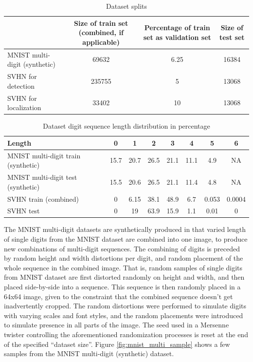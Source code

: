 \documentclass{article}
\begin{document}
	\begin{table}[h]
		\centering
		\begin{tabulary}{\linewidth}{l|CCC}
			\toprule
			& Size of train set (combined, if applicable) & Percentage of train set as validation set & Size of test set \\
			\midrule
			MNIST multi-digit (synthetic) & 69632                                       & 6.25                                      & 16384            \\
			SVHN for detection            & 235755                                      & 5                                         & 13068            \\
			SVHN for localization         & 33402                                       & 10                                       & 13068      		 \\
			\bottomrule      
		\end{tabulary}	
		\caption{Dataset splits}	
		\label{tab:dataset-splits}
	\end{table}
	
	\begin{table}[h]
		\centering
		\begin{tabulary}{\linewidth}{l|CCCCCCC}
			\toprule
			Length                              & 0    & 1    & 2    & 3    & 4    & 5     & 6      \\
			\midrule
			MNIST multi-digit train (synthetic) & 15.7 & 20.7 & 26.5 & 21.1 & 11.1 & 4.9   & NA     \\
			MNIST multi-digit test (synthetic)  & 15.5 & 20.6 & 26.5 & 21.1 & 11.4 & 4.8   & NA     \\
			SVHN train (combined)               & 0    & 6.15 & 38.1 & 48.9 & 6.7  & 0.053 & 0.0004 \\
			SVHN test                           & 0    & 19   & 63.9 & 15.9 & 1.1  & 0.01  & 0                                    \\
			\bottomrule      
		\end{tabulary}	
		\caption{Dataset digit sequence length distribution in percentage}
		\label{tab:dataset-length-dist}
	\end{table}
		
	The MNIST multi-digit datasets are synthetically produced in that varied length of single digits from the MNIST dataset are combined into one image, to produce new combinations of multi-digit sequences. The combining of digits is preceded by random height and width distortions per digit, and random placement of the whole sequence in the combined image. That is, random samples of single digits from MNIST dataset are first distorted randomly on height and width, and then placed side-by-side into a sequence. This sequence is then randomly placed in a 64x64 image, given to the constraint that the combined sequence doesn't get inadvertently cropped. The random distortions were performed to simulate digits with varying scales and font styles, and the random placements were introduced to simulate presence in all parts of the image. The seed used in a Mersenne twister controlling the aforementioned randomization processes is reset at the end of the specified ``dataset size''. Figure \ref{fig:mnist_multi_sample} shows a few samples from the MNIST multi-digit (synthetic) dataset.
	
\end{document}
